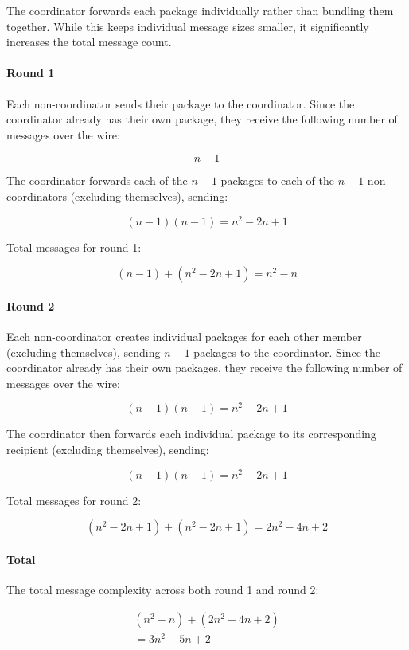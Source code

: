 The coordinator forwards each package individually rather than bundling them together. While this keeps individual message sizes smaller, it significantly increases the total message count.

\paragraph{Round 1}

Each non-coordinator sends their package to the coordinator. Since the coordinator already has their own package, they receive the following number of messages over the wire:

\[n-1\]

The coordinator forwards each of the $n-1$ packages to each of the $n-1$ non-coordinators (excluding themselves), sending:

\[(n-1)(n-1) = n^2-2n+1\]

Total messages for round 1:

\[(n-1)+(n^2-2n+1) = n^2-n\]

\paragraph{Round 2}

Each non-coordinator creates individual packages for each other member (excluding themselves), sending $n-1$ packages to the coordinator. Since the coordinator already has their own packages, they receive the following number of messages over the wire:

\[(n-1)(n-1) = n^2-2n+1\]

The coordinator then forwards each individual package to its corresponding recipient (excluding themselves), sending:

\[(n-1)(n-1) = n^2-2n+1\]

Total messages for round 2:

\[(n^2-2n+1)+(n^2-2n+1) = 2n^2-4n+2\]

\paragraph{Total}

The total message complexity across both round 1 and round 2:

\begin{equation}
\begin{aligned}
(n^2-n)+(2n^2-4n+2)\\= 3n^2-5n+2
\end{aligned}
\end{equation}

